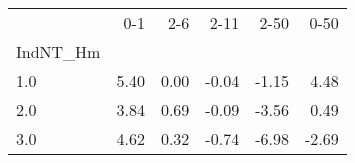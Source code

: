 \begin{tabular}{lrrrrr}
\toprule
{} &   0-1 &   2-6 &  2-11 &  2-50 &  0-50 \\
IndNT\_Hm &       &       &       &       &       \\
\midrule
1.0      &  5.40 &  0.00 & -0.04 & -1.15 &  4.48 \\
2.0      &  3.84 &  0.69 & -0.09 & -3.56 &  0.49 \\
3.0      &  4.62 &  0.32 & -0.74 & -6.98 & -2.69 \\
\bottomrule
\end{tabular}
